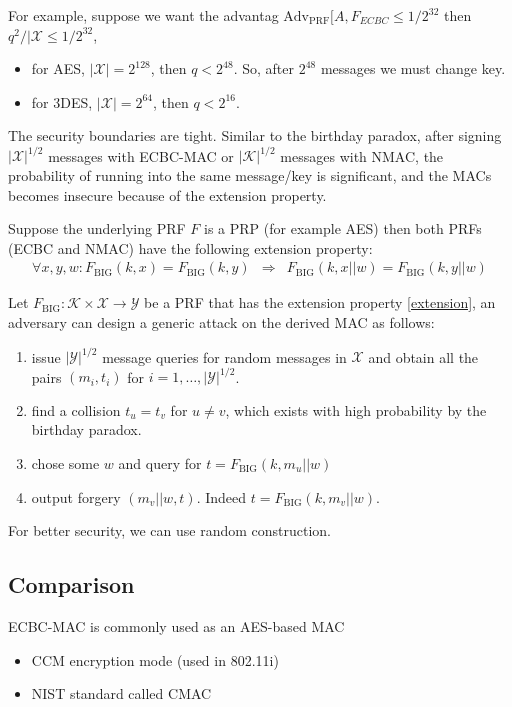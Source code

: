 \documentclass{article}
\begin{document}
For example, suppose we want the advantag $\text{Adv}_\text{PRF}[A, F_{ECBC} \le
1/2^{32}$ then $q^2 / |\mathcal{X} \le 1 / 2^{32}$,
\begin{itemize}
\item for AES, $|\mathcal{X}| = 2^{128}$, then $q < 2^{48}$. So, after $2^{48}$
  messages we must change key.
\item for 3DES, $|\mathcal{X}| = 2^{64}$, then $q < 2^{16}$.
\end{itemize}

The security boundaries are tight. Similar to the birthday paradox, after
signing $|\mathcal{X}|^{1/2}$ messages with ECBC-MAC or $|\mathcal{K}|^{1/2}$
messages with NMAC, the probability of running into the same message/key is
significant, and the MACs becomes insecure because of the extension property.

Suppose the underlying PRF $F$ is a PRP (for example AES) then both PRFs (ECBC
and NMAC) have the following extension property:
\begin{eqnarray}
  \forall x, y, w: F_\text{BIG} (k, x) = F_\text{BIG} (k, y) &\Rightarrow&
  F_\text{BIG}(k, x||w) = F_\text{BIG}(k, y || w) \label{extension}
\end{eqnarray}

Let $F_\text{BIG}: \mathcal{K} \times \mathcal{X} \to \mathcal{Y}$ be a PRF that
has the extension property \eqref{extension}, an adversary can design a generic
attack on the derived MAC as follows:
\begin{enumerate}
  \item issue $|\mathcal{Y}|^{1/2}$ message queries for random messages in
    $\mathcal{X}$ and obtain all the pairs $(m_i, t_i)$ for $i = 1, \dotsc,
    |\mathcal{Y}|^{1/2}$.
  \item find a collision $t_u = t_v$ for $u \neq v$, which exists with high
    probability by the birthday paradox.
  \item chose some $w$ and query for $t = F_\text{BIG}(k, m_u || w)$
  \item output forgery $(m_v || w, t)$. Indeed $t = F_\text{BIG}(k, m_v || w)$.
\end{enumerate}

For better security, we can use random construction.

\subsection{Comparison}
ECBC-MAC is commonly used as an AES-based MAC
\begin{itemize}
\item CCM encryption mode (used in 802.11i)
\item NIST standard called CMAC
\end{itemize}
\end{document}
